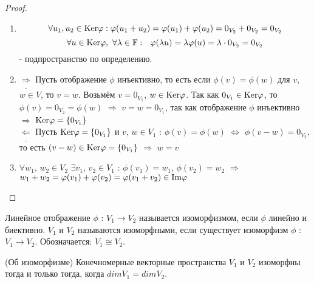   \begin{proof}
    \begin{enumerate}
      \item \[\forall u_1, u_2\in \textup{Ker}\phi: 
      \phi(u_1+u_2)=\phi(u_1)+\phi(u_2)=0_{V_2}+0_{V_2}=0_{V_2}\]
      \[\forall u\in \textup{Ker}\phi, \ \forall\lambda\in\F: \ \ \phi(\lambda u)=\lambda\phi(u)=\lambda\cdot 0_{V_2}=0_{V_2}\]
      - подпространство по определению.
      \item $\underline{\Longrightarrow}$ Пусть отображение $\phi$ инъективно, то есть если $\phi(v)=\phi(w)$ для $v$, $w\in V$, то $v=w$. Возьмём $v=0_{V_1}$, $w\in \textup{Ker}\phi$. Так как $0_{V_1} \in \textup{Ker}\phi$, то $\phi(v)=0_{V_2}=\phi(w)$ $\Longrightarrow$ $v=w=0_{V_1}$, так как отображение $\phi$ инъективно $\Longrightarrow$ $\textup{Ker}\phi=\{0_{V_1}\}$\\
      $\underline{\Longleftarrow}$ Пусть $\textup{Ker}\phi=\{0_{V_1}\}$ и $v$, $w\in V_1$ : $\phi(v)=\phi(w)$ $\Leftrightarrow$ $\phi(v-w)=0_{V_2}$, то есть $(v-w)\in \textup{Ker}\phi=\{0_{V_1}\}$ $\Longrightarrow$ $w=v$
      \item $\forall w_1$, $w_2\in V_2$ $\exists v_1$, $v_2\in V_1$ : $\phi(v_1)=w_1$, $\phi(v_2)=w_2$ $\Longrightarrow$ $w_1+w_2=\phi(v_1)+\phi(v_2)=\phi(v_1+v_2)\in \textup{Im}\phi$
    \end{enumerate}
  \end{proof}
  \begin{definition}
    Линейное отображение $\phi$ : $V_1 \to V_2$ называется изоморфизмом, если $\phi$ линейно и биективно. $V_1$ и $V_2$ называются изоморфными, если существует изоморфизм $\phi$ : $V_1 \to V_2$. Обозначается: $V_1 \cong V_2$.
  \end{definition}
  \begin{theorem}(Об изоморфизме)
    Конечномерные векторные пространства $V_1$ и $V_2$ изоморфны тогда и только тогда, когда $dimV_1 = dimV_2$. 
  \end{theorem}
